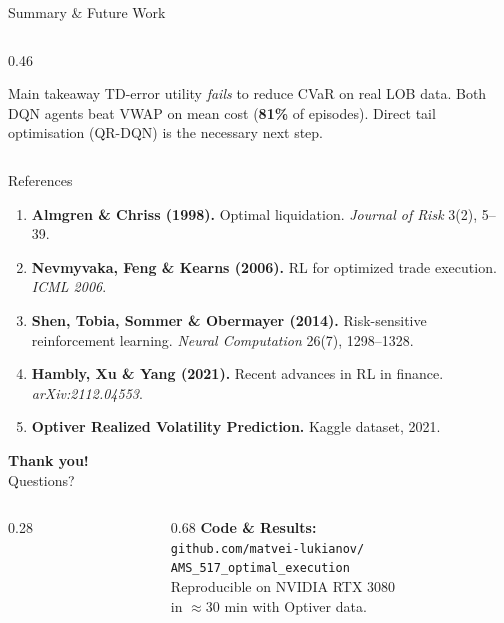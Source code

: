 \documentclass[aspectratio=169, 10pt]{beamer}
\begin{document}
\begin{frame}{Summary \& Future Work}
\begin{columns}[T]
\begin{column}{0.46\textwidth}
      \bigskip
      \begin{alertblock}{Main takeaway}
        TD-error utility \emph{fails} to reduce CVaR on real LOB data.
        Both DQN agents beat VWAP on mean cost (\textbf{81\%} of episodes).
        Direct tail optimisation (QR-DQN) is the necessary next step.
      \end{alertblock}
    \end{column}
  \end{columns}
\end{frame}

\begin{frame}{References}
  \footnotesize
  \begin{enumerate}
    \item \textbf{Almgren \& Chriss (1998).}
      Optimal liquidation. \textit{Journal of Risk} 3(2), 5--39.
    \item \textbf{Nevmyvaka, Feng \& Kearns (2006).}
      RL for optimized trade execution. \textit{ICML 2006}.
    \item \textbf{Shen, Tobia, Sommer \& Obermayer (2014).}
      Risk-sensitive reinforcement learning.
      \textit{Neural Computation} 26(7), 1298--1328.
    \item \textbf{Hambly, Xu \& Yang (2021).}
      Recent advances in RL in finance. \textit{arXiv:2112.04553}.
    \item \textbf{Optiver Realized Volatility Prediction.}
      Kaggle dataset, 2021.
  \end{enumerate}
\end{frame}

\begin{frame}[plain]
  \centering
  \vspace{0.8cm}
  {\Huge\color{myblue}\textbf{Thank you!}}\\[10pt]
  {\large Questions?}\\[20pt]

  \begin{columns}[c]
    \begin{column}{0.28\textwidth}
      \centering
    \end{column}
    \begin{column}{0.68\textwidth}
      \footnotesize
      \textbf{Code \& Results:}\\[4pt]
      \texttt{github.com/matvei-lukianov/}\\
      \texttt{AMS\_517\_optimal\_execution}\\[10pt]
      Reproducible on NVIDIA RTX 3080\\
      in $\approx$30 min with Optiver data.
    \end{column}
  \end{columns}
\end{frame}
\end{document}
